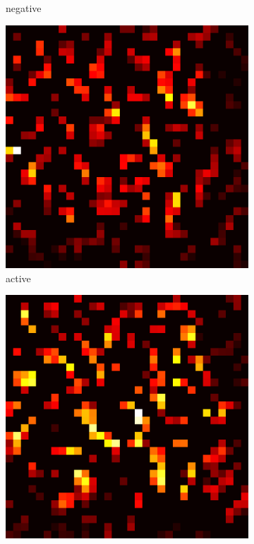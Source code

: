 \documentclass[preprint,12pt]{elsarticle}
\begin{document}
\begin{figure}
\begin{subfigure}{0.14\textwidth}
        \caption{negative}
    \end{subfigure}
    \hfill
    \begin{subfigure}{0.14\textwidth}
        \centering
        \includegraphics[width=\linewidth]{../visualizations/examples/cifar10/resnet18/active_saliency_map/3.png}
        \caption{active}
    \end{subfigure}
    \hfill
    \begin{subfigure}{0.14\textwidth}
        \centering
        \includegraphics[width=\linewidth]{../visualizations/examples/cifar10/resnet18/inactive_saliency_map/3.png}

\end{subfigure}
\end{figure}
\end{document}
